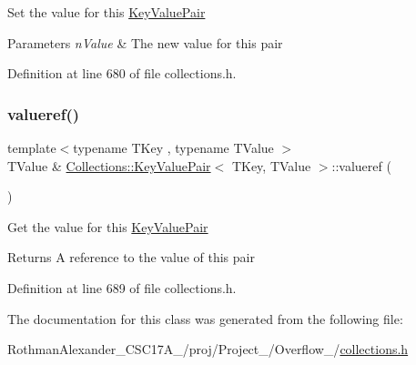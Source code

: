 Set the value for this \hyperlink{class_collections_1_1_key_value_pair}{Key\+Value\+Pair} 
\begin{DoxyParams}{Parameters}
{\em n\+Value} & The new value for this pair \\
\hline
\end{DoxyParams}


Definition at line 680 of file collections.\+h.

\hypertarget{class_collections_1_1_key_value_pair_a233be67709beba1bd5a4d00c249345d5}{}\label{class_collections_1_1_key_value_pair_a233be67709beba1bd5a4d00c249345d5} 
\subsubsection{\texorpdfstring{valueref()}{valueref()}}
{\footnotesize\ttfamily template$<$typename T\+Key , typename T\+Value $>$ \\
T\+Value \& \hyperlink{class_collections_1_1_key_value_pair}{Collections\+::\+Key\+Value\+Pair}$<$ T\+Key, T\+Value $>$\+::valueref (\begin{DoxyParamCaption}{ }\end{DoxyParamCaption})}

Get the value for this \hyperlink{class_collections_1_1_key_value_pair}{Key\+Value\+Pair} \begin{DoxyReturn}{Returns}
A reference to the value of this pair 
\end{DoxyReturn}


Definition at line 689 of file collections.\+h.



The documentation for this class was generated from the following file\+:\begin{DoxyCompactItemize}
\item 
Rothman\+Alexander\+\_\+\+C\+S\+C17\+A\+\_/proj/\+Project\+\_/\+Overflow\+\_/\hyperlink{collections_8h}{collections.\+h}\end{DoxyCompactItemize}
